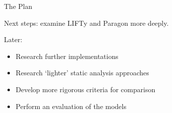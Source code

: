 %
%
%
%
%

\begin{frame}{The Plan}

Next steps: examine LIFTy and Paragon more deeply.

Later:
\begin{itemize}
	\item Research further implementations
	\item Research `lighter' static analysis approaches
	\item Develop more rigorous criteria for comparison
	\item Perform an evaluation of the models
\end{itemize}

\end{frame}
